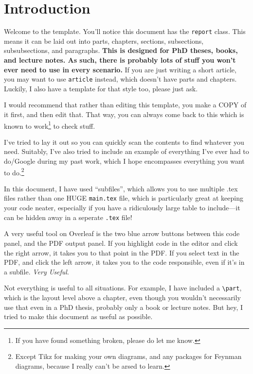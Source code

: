 \documentclass[../main]{subfiles}
\begin{document}
\chapter{Introduction}

Welcome to the template. You'll notice this document has the \texttt{report} class. This means it can be laid out into parts, chapters, sections, subsections, subsubsections, and paragraphs. \textbf{This is designed for PhD theses, books, and lecture notes. As such, there is probably lots of stuff you won't ever need to use in every scenario.} If you are just writing a short article, you may want to use \texttt{article} instead, which doesn't have parts and chapters. Luckily, I also have a template for that style too, please just ask.

I would recommend that rather than editing this template, you make a COPY of it first, and then edit that. That way, you can always come back to this which is known to work\footnote{If you have found something broken, please do let me know.} to check stuff.

I've tried to lay it out so you can quickly scan the contents to find whatever you need. Suitably, I've also tried to include an example of everything I've ever had to do/Google during my past work, which I hope encompasses everything you want to do.\footnote{Except Tikz for making your own diagrams, and any packages for Feynman diagrams, because I really can't be arsed to learn.}

In this document, I have used ``subfiles'', which allows you to use multiple .tex files rather than one HUGE \texttt{main.tex} file, which is particularly great at keeping your code neater, especially if you have a ridiculously large table to include---it can be hidden away in a seperate \texttt{.tex} file!

A very useful tool on Overleaf is the two blue arrow buttons between this code panel, and the PDF output panel. If you highlight code in the editor and click the right arrow, it takes you to that point in the PDF. If you select text in the PDF, and click the left arrow, it takes you to the code responsible, even if it's in a subfile. \emph{Very Useful}.

Not everything is useful to all situations. For example, I have included a \verb|\part|, which is the layout level above a chapter, even though you wouldn't necessarily use that even in a PhD thesis, probably only a book or lecture notes. But hey, I tried to make this document as useful as possible.
\end{document}
